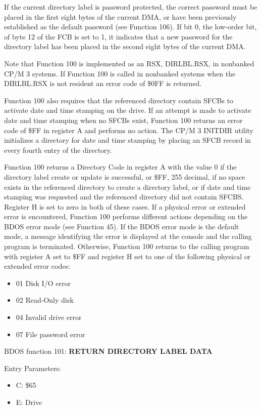 If the current directory label is password protected, the correct
password must be placed in the first eight bytes of the current DMA,
or have been previously established as the default password (see
Function 106). If bit 0, the low-order bit, of byte 12 of the FCB is
set to 1, it indicates that a new password for the directory label has
been placed in the second eight bytes of the current DMA.

Note that Function 100 is implemented as an RSX, DIRLBL.RSX, in
nonbanked CP/M 3 systems. If Function 100 is called in nonbanked
systems when the DIRLBL.RSX is not resident an error code of \$0FF is
returned.

Function 100 also requires that the referenced directory contain SFCBs
to activate date and time stamping on the drive. If an attempt is made
to activate date and time stamping when no SFCBs exist, Function 100
returns an error code of \$FF in register A and performs no
action. The CP/M 3 INITDIR utility initializes a directory for date
and time stamping by placing an SFCB record in every fourth entry of
the directory.

Function 100 returns a Directory Code in register A with the value 0
if the directory label create or update is successful, or \$FF, 255
decimal, if no space exists in the referenced directory to create a
directory label, or if date and time stamping was requested and the
referenced directory did not contain SFCBS. Register H is set to zero
in both of these cases. If a physical error or extended error is
encountered, Function 100 performs different actions depending on the
BDOS error mode (see Function 45). If the BDOS error mode is the
default mode, a message identifying the error is displayed at the
console and the calling program is terminated. Otherwise, Function 100
returns to the calling program with register A set to \$FF and
register H set to one of the following physical or extended error
codes:

\begin{itemize}
\item 01 Disk I/O error
\item 02 Read-Only disk
\item 04 Invalid drive error
\item 07 File password error
\end{itemize}

BDOS function 101: \textbf{RETURN DIRECTORY LABEL DATA}

Entry Parameters:
\begin{itemize}
\item[] C: \$65
\item[] E: Drive
\end{itemize}

